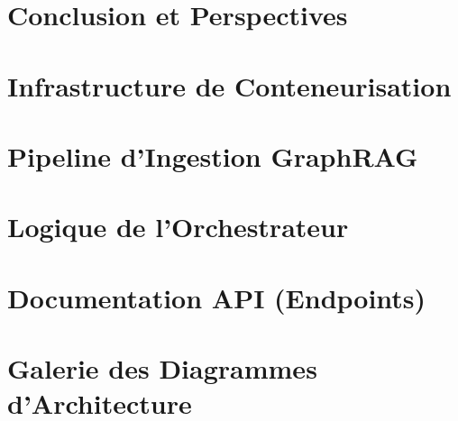 \documentclass
[
    twoside,                 %
    openright,               %
    cleardoublepage = empty, %
    fontsize = 12 pt,        %
    french,                %
    captions = tableheading, %
    numbers = noenddot,      %
    footheight = 35 pt,      %
]
{scrbook}
\begin{document}


    \makeatletter
        \def\toclevel@chapter{-1}
        \def\toclevel@section{0}
    \makeatother

    \chapter{Conclusion et Perspectives}
    
    
    \appendix
	\chapter{Infrastructure de Conteneurisation}
	
	\chapter{Pipeline d'Ingestion GraphRAG}
	
	\chapter{Logique de l'Orchestrateur}
	
	\chapter{Documentation API (Endpoints)}
	
	\chapter{Galerie des Diagrammes d'Architecture}
	

    \pagestyle{plain}

    \renewcommand*{\bibfont}{\small}
    \printbibheading[title={Bibliographie}]
    \printbibliography[heading = none]

%    
\end{document}
